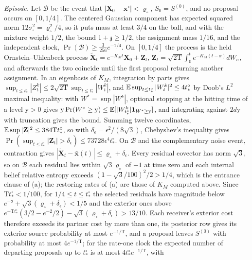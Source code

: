 \emph{Episode.} Let \(\mathscr B\) be the event that
\(|\mathbf X_0-\mathbf x^\circ|<\varrho_\circ\), \(S_0=S^{(0)}\), and no proposal
occurs on \([0,1/4]\). The centered Gaussian component has expected squared
norm \(12\sigma_\circ^2=\varrho_\circ^2/4\), so it puts mass at least \(3/4\) on
the ball, and with the mixture weight \(1/2\), the bound
\(1+\mathfrak z\ge1/2\), the assignment mass \(1/16\), and the independent
clock, \(\Pr(\mathscr B)\ge\tfrac3{256}e^{-1/4}\). On \([0,1/4]\) the process is
the held Ornstein--Uhlenbeck process
\(\widetilde{\mathbf X}_t=e^{-K_Mt}\mathbf X_0+\mathbf Z_t\),
\(\mathbf Z_t=\sqrt{2\mathrm T}\int_0^te^{-K_M(t-\sigma)}dW_\sigma\), and afterwards
the two coincide until the first proposal returning another assignment. In an
eigenbasis of \(K_M\), integration by parts gives
\(\sup_{t\le t^\circ_*}|Z^k_t|\le2\sqrt{2\mathrm T}\sup_{t\le t^\circ_*}|W^k_t|\),
and \(\mathbb E\sup_{t\le t^\circ_*}|W^k_t|^2\le4t^\circ_*\) by Doob's \(L^2\)
maximal inequality: with \(W^*=\sup|W^k|\), optional stopping at the hitting
time of a level \(\mathrm y>0\) gives
\(\mathrm y\Pr(W^*\ge\mathrm y)\le\mathbb E[|W^k_{t^\circ_*}|\mathbf 1_{W^*\ge\mathrm y}]\),
and integrating against \(2 d\mathrm y\) with truncation gives the bound.
Summing twelve coordinates, \(\mathbb E\sup|\mathbf Z|^2\le384\mathrm Tt^\circ_*\), so
with \(\delta_\epsilon=\epsilon^2/(8\sqrt3)\), Chebyshev's inequality gives
\(\Pr(\sup_{t\le t^\circ_*}|\mathbf Z_t|>\delta_\epsilon)\le73728 \epsilon^4t^\circ_*\).
On \(\mathscr B\) and the complementary noise event, contraction gives
\(|\widetilde{\mathbf X}_t-\bar{\mathbf x}(t)|\le\varrho_\circ+\delta_\epsilon\).
Every residual covector has norm \(\sqrt3\), so on \(\mathscr B\) each
residual lies within \(\sqrt3\varrho_\circ\) of \(-1\) at time zero and each
internal belief relative entropy exceeds \((1-\sqrt3/100)^2/2>1/4\), which is
the entrance clause of (a); the restoring rates of (a) are those of \(K_M\)
computed above. Since \(\mathrm Tt^\circ_*<1/100\),
for \(1/4\le t\le t^\circ_*\) the selected residuals have magnitude below
\(e^{-2}+\sqrt3(\varrho_\circ+\delta_\epsilon)<1/5\) and the exterior ones above
\(e^{-\mathrm Tt^\circ_*}(3/2-e^{-2}/2)-\sqrt3(\varrho_\circ+\delta_\epsilon)>13/10\).
Each receiver's exterior cost therefore exceeds its partner cost by more than
one, its posterior row gives its exterior source probability at most
\(e^{-1/\mathrm T}\), and a proposal leaves \(S^{(0)}\) with probability at most
\(4e^{-1/\mathrm T}\); for the rate-one clock the expected number of departing
proposals up to \(t^\circ_*\) is at most \(4t^\circ_*e^{-1/\mathrm T}\), with

